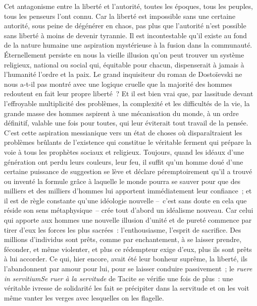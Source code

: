 \documentclass[french,twoside]{book} %
\newcommand\foreign[1]{\emph{#1}}
\begin{document}
Cet antagonisme entre la liberté et l’autorité, toutes les époques, tous les peuples, tous les penseurs l’ont connu. Car la liberté est impossible sans une certaine autorité, sous peine de dégénérer en chaos, pas plus que l’autorité n’est possible sans liberté à moins de devenir tyrannie. Il est incontestable qu’il existe au fond de la nature humaine une aspiration mystérieuse à la fusion dans la communauté. Éternellement persiste en nous la vieille illusion qu’on peut trouver un système religieux, national ou social qui, équitable pour chacun, dispenserait à jamais à l’humanité l’ordre et la paix. Le grand inquisiteur du roman de Dostoïevski ne nous a-t-il pas montré avec une logique cruelle que la majorité des hommes redoutent en fait leur propre liberté ? Et il est bien vrai que, par lassitude devant l’effroyable multiplicité des problèmes, la complexité et les difficultés de la vie, la grande masse des hommes aspirent à une mécanisation du monde, à un ordre définitif, valable une fois pour toutes, qui leur éviterait tout travail de la pensée. C’est cette aspiration messianique vers un état de choses où disparaîtraient les problèmes brûlants de l’existence qui constitue le véritable ferment qui prépare la voie à tous les prophètes sociaux et religieux. Toujours, quand les idéaux d’une génération ont perdu leurs couleurs, leur feu, il suffit qu’un homme doué d’une certaine puissance de suggestion se lève et déclare péremptoirement qu’il a trouvé ou inventé la formule grâce à laquelle le monde pourra se sauver pour que des milliers et des milliers d’hommes lui apportent immédiatement leur confiance ; et il est de règle constante qu’une idéologie nouvelle – c’est sans doute en cela que réside son sens métaphysique – crée tout d’abord un idéalisme nouveau. Car celui qui apporte aux hommes une nouvelle illusion d’unité et de pureté commence par tirer d’eux les forces les plus sacrées : l’enthousiasme, l’esprit de sacrifice. Des millions d’individus sont prêts, comme par enchantement, à se laisser prendre, féconder, et même violenter, et plus ce rédempteur exige d’eux, plus ils sont prêts à lui accorder. Ce qui, hier encore, avait été leur bonheur suprême, la liberté, ils l’abandonnent par amour pour lui, pour se laisser conduire passivement ; le \foreign{ruere in servitiumSe ruer à la servitude} de Tacite se vérifie une fois de plus : une véritable ivresse de solidarité les fait se précipiter dans la servitude et on les voit même vanter les verges avec lesquelles on les flagelle.\par
\end{document}

